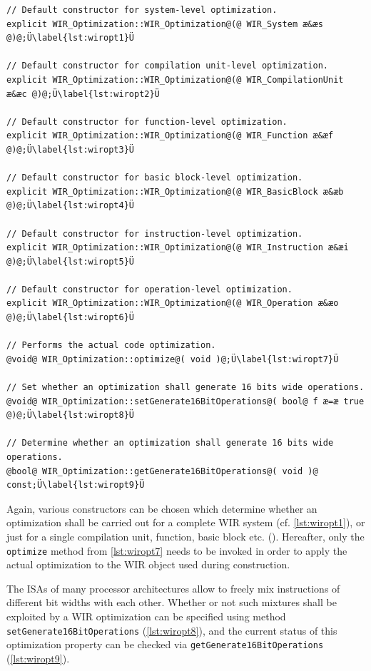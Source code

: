 \begin{lstlisting}[style=code,float=ht,caption={Code Optimization API of Class \texttt{WIR\_Optimization}},label=lst:wiropt]
// Default constructor for system-level optimization.
explicit WIR_Optimization::WIR_Optimization@(@ WIR_System æ&æs @)@;Ü\label{lst:wiropt1}Ü

// Default constructor for compilation unit-level optimization.
explicit WIR_Optimization::WIR_Optimization@(@ WIR_CompilationUnit æ&æc @)@;Ü\label{lst:wiropt2}Ü

// Default constructor for function-level optimization.
explicit WIR_Optimization::WIR_Optimization@(@ WIR_Function æ&æf @)@;Ü\label{lst:wiropt3}Ü

// Default constructor for basic block-level optimization.
explicit WIR_Optimization::WIR_Optimization@(@ WIR_BasicBlock æ&æb @)@;Ü\label{lst:wiropt4}Ü

// Default constructor for instruction-level optimization.
explicit WIR_Optimization::WIR_Optimization@(@ WIR_Instruction æ&æi @)@;Ü\label{lst:wiropt5}Ü

// Default constructor for operation-level optimization.
explicit WIR_Optimization::WIR_Optimization@(@ WIR_Operation æ&æo @)@;Ü\label{lst:wiropt6}Ü

// Performs the actual code optimization.
@void@ WIR_Optimization::optimize@( void )@;Ü\label{lst:wiropt7}Ü

// Set whether an optimization shall generate 16 bits wide operations.
@void@ WIR_Optimization::setGenerate16BitOperations@( bool@ f æ=æ true @)@;Ü\label{lst:wiropt8}Ü

// Determine whether an optimization shall generate 16 bits wide operations.
@bool@ WIR_Optimization::getGenerate16BitOperations@( void )@ const;Ü\label{lst:wiropt9}Ü
\end{lstlisting}

Again, various constructors can be chosen which determine whether an optimization shall be carried out for a complete \gls{WIR} system (cf. \cref{lst:wiropt1}), or just for a single compilation unit, function, basic block etc. ().
Hereafter, only the \texttt{optimize} method from \cref{lst:wiropt7} needs to be invoked in order to apply the actual optimization to the \gls{WIR} object used during construction.

The \glspl{ISA} of many processor architectures allow to freely mix instructions of different bit widths with each other.
Whether or not such mixtures shall be exploited by a \gls{WIR} optimization can be specified using method \texttt{setGener\-ate16BitOperations} (\cref{lst:wiropt8}), and the current status of this optimization property can be checked via \texttt{getGen\-erate16BitOperations} (\cref{lst:wiropt9}).

